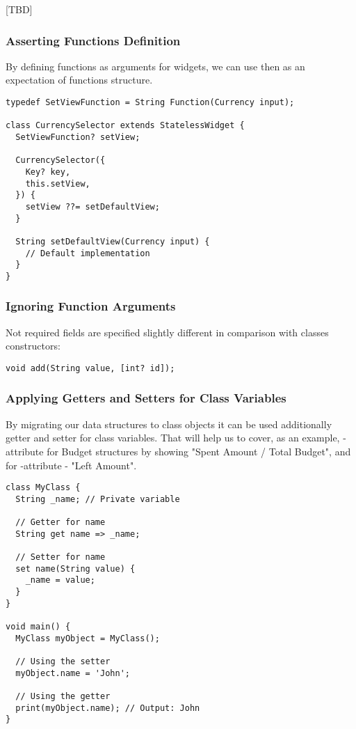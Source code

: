 

[TBD]


\subsubsection{Asserting Functions Definition}

By defining functions as arguments for widgets, we can use then as an expectation of functions structure.

\begin{lstlisting}
typedef SetViewFunction = String Function(Currency input);

class CurrencySelector extends StatelessWidget {
  SetViewFunction? setView;

  CurrencySelector({
    Key? key,
    this.setView,
  }) {
    setView ??= setDefaultView;
  }

  String setDefaultView(Currency input) {
    // Default implementation
  }
}
\end{lstlisting}


\subsubsection{Ignoring Function Arguments}

Not required fields are specified slightly different in comparison with classes constructors:

\begin{lstlisting}
void add(String value, [int? id]);
\end{lstlisting}


\subsubsection{Applying Getters and Setters for Class Variables}

By migrating our data structures to class objects it can be used additionally getter and setter for class variables.
That will help us to cover, as an example, -attribute for Budget structures by showing 
"Spent Amount / Total Budget", and for -attribute - "Left Amount".

\begin{lstlisting}
class MyClass {
  String _name; // Private variable

  // Getter for name
  String get name => _name;

  // Setter for name
  set name(String value) {
    _name = value;
  }
}

void main() {
  MyClass myObject = MyClass();

  // Using the setter
  myObject.name = 'John';

  // Using the getter
  print(myObject.name); // Output: John
}
\end{lstlisting}


